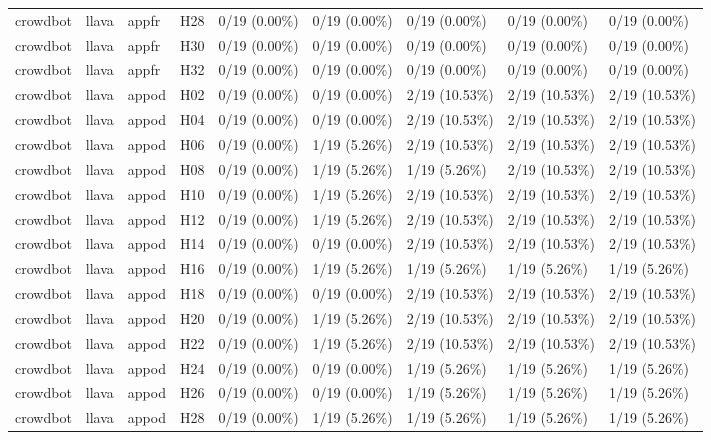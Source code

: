 \begin{longtable}{lllllllll}
crowdbot & llava & appfr & H28 & 0/19 (0.00\%) & 0/19 (0.00\%) & 0/19 (0.00\%) & 0/19 (0.00\%) & 0/19 (0.00\%) \\
crowdbot & llava & appfr & H30 & 0/19 (0.00\%) & 0/19 (0.00\%) & 0/19 (0.00\%) & 0/19 (0.00\%) & 0/19 (0.00\%) \\
crowdbot & llava & appfr & H32 & 0/19 (0.00\%) & 0/19 (0.00\%) & 0/19 (0.00\%) & 0/19 (0.00\%) & 0/19 (0.00\%) \\
crowdbot & llava & appod & H02 & 0/19 (0.00\%) & 0/19 (0.00\%) & 2/19 (10.53\%) & 2/19 (10.53\%) & 2/19 (10.53\%) \\
crowdbot & llava & appod & H04 & 0/19 (0.00\%) & 0/19 (0.00\%) & 2/19 (10.53\%) & 2/19 (10.53\%) & 2/19 (10.53\%) \\
crowdbot & llava & appod & H06 & 0/19 (0.00\%) & 1/19 (5.26\%) & 2/19 (10.53\%) & 2/19 (10.53\%) & 2/19 (10.53\%) \\
crowdbot & llava & appod & H08 & 0/19 (0.00\%) & 1/19 (5.26\%) & 1/19 (5.26\%) & 2/19 (10.53\%) & 2/19 (10.53\%) \\
crowdbot & llava & appod & H10 & 0/19 (0.00\%) & 1/19 (5.26\%) & 2/19 (10.53\%) & 2/19 (10.53\%) & 2/19 (10.53\%) \\
crowdbot & llava & appod & H12 & 0/19 (0.00\%) & 1/19 (5.26\%) & 2/19 (10.53\%) & 2/19 (10.53\%) & 2/19 (10.53\%) \\
crowdbot & llava & appod & H14 & 0/19 (0.00\%) & 0/19 (0.00\%) & 2/19 (10.53\%) & 2/19 (10.53\%) & 2/19 (10.53\%) \\
crowdbot & llava & appod & H16 & 0/19 (0.00\%) & 1/19 (5.26\%) & 1/19 (5.26\%) & 1/19 (5.26\%) & 1/19 (5.26\%) \\
crowdbot & llava & appod & H18 & 0/19 (0.00\%) & 0/19 (0.00\%) & 2/19 (10.53\%) & 2/19 (10.53\%) & 2/19 (10.53\%) \\
crowdbot & llava & appod & H20 & 0/19 (0.00\%) & 1/19 (5.26\%) & 2/19 (10.53\%) & 2/19 (10.53\%) & 2/19 (10.53\%) \\
crowdbot & llava & appod & H22 & 0/19 (0.00\%) & 1/19 (5.26\%) & 2/19 (10.53\%) & 2/19 (10.53\%) & 2/19 (10.53\%) \\
crowdbot & llava & appod & H24 & 0/19 (0.00\%) & 0/19 (0.00\%) & 1/19 (5.26\%) & 1/19 (5.26\%) & 1/19 (5.26\%) \\
crowdbot & llava & appod & H26 & 0/19 (0.00\%) & 0/19 (0.00\%) & 1/19 (5.26\%) & 1/19 (5.26\%) & 1/19 (5.26\%) \\
crowdbot & llava & appod & H28 & 0/19 (0.00\%) & 1/19 (5.26\%) & 1/19 (5.26\%) & 1/19 (5.26\%) & 1/19 (5.26\%) \\

\end{longtable}
